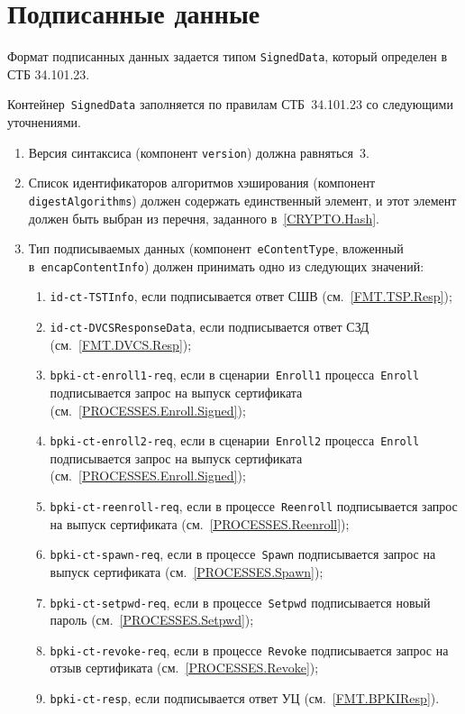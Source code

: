 \section{Подписанные данные}\label{FMT.SignedData}

Формат подписанных данных задается типом \texttt{SignedData}, 
который определен в СТБ 34.101.23. 

Контейнер~\texttt{SignedData} заполняется по правилам СТБ~34.101.23
со следующими уточнениями.

\begin{enumerate}
\item
Версия синтаксиса (компонент \texttt{version}) должна равняться~$3$.

\item
Список идентификаторов алгоритмов хэширования (компонент 
\texttt{digestAlgorithms}) должен содержать единственный элемент, и этот 
элемент должен быть выбран из перечня, заданного в~\ref{CRYPTO.Hash}.

\item
Тип подписываемых данных (компонент~\texttt{eContentType}, вложенный 
в~\texttt{encapContentInfo}) должен принимать одно из следующих значений:

\begin{enumerate}
\item
\texttt{id-ct-TSTInfo}, если подписывается ответ СШВ (см.~\ref{FMT.TSP.Resp});
\item
\texttt{id-ct-DVCSResponseData}, если подписывается ответ СЗД 
(см.~\ref{FMT.DVCS.Resp});
\item
\texttt{bpki-ct-enroll1-req}, если в сценарии~\texttt{Enroll1} 
процесса~\texttt{Enroll} подписывается запрос на выпуск сертификата 
(см.~\ref{PROCESSES.Enroll.Signed}); 
\item
\texttt{bpki-ct-enroll2-req}, если в сценарии~\texttt{Enroll2} 
процесса~\texttt{Enroll} подписывается запрос на выпуск сертификата 
(см.~\ref{PROCESSES.Enroll.Signed}); 
\item
\texttt{bpki-ct-reenroll-req}, если в процессе~\texttt{Reenroll} 
подписывается запрос на выпуск сертификата 
(см.~\ref{PROCESSES.Reenroll}); 
\item
\texttt{bpki-ct-spawn-req}, если в процессе~\texttt{Spawn} 
подписывается запрос на выпуск сертификата 
(см.~\ref{PROCESSES.Spawn}); 
\item
\texttt{bpki-ct-setpwd-req}, если в процессе~\texttt{Setpwd} 
подписывается новый пароль (см.~\ref{PROCESSES.Setpwd}); 
\item
\texttt{bpki-ct-revoke-req}, если в процессе~\texttt{Revoke} 
подписывается запрос на отзыв сертификата (см.~\ref{PROCESSES.Revoke}); 
\item
\texttt{bpki-ct-resp}, если подписывается ответ УЦ 
(см.~\ref{FMT.BPKIResp}).
\end{enumerate}


\end{enumerate}
